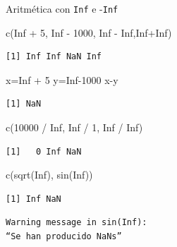 \documentclass[
  ignorenonframetext,
  aspectratio=169,
  spanish,
]{beamer}
\newenvironment{Shaded}{\begin{snugshade}}{\end{snugshade}}
\newcommand{\ConstantTok}[1]{\textcolor[rgb]{0.56,0.35,0.01}{#1}}
\newcommand{\DecValTok}[1]{\textcolor[rgb]{0.68,0.00,0.00}{#1}}
\newcommand{\FunctionTok}[1]{\textcolor[rgb]{0.28,0.35,0.67}{#1}}
\newcommand{\NormalTok}[1]{\textcolor[rgb]{0.00,0.23,0.31}{#1}}
\newcommand{\OtherTok}[1]{\textcolor[rgb]{0.00,0.23,0.31}{#1}}
\newcommand{\SpecialCharTok}[1]{\textcolor[rgb]{0.37,0.37,0.37}{#1}}
\begin{document}
\begin{frame}[fragile]{Aritmética con \texttt{Inf} e -\texttt{Inf}}
\label{aritmuxe9tica-con-inf-e--inf}
\begin{Shaded}
\begin{Highlighting}[]
\FunctionTok{c}\NormalTok{(}\ConstantTok{Inf} \SpecialCharTok{+} \DecValTok{5}\NormalTok{, }\ConstantTok{Inf} \SpecialCharTok{{-}} \DecValTok{1000}\NormalTok{, }\ConstantTok{Inf} \SpecialCharTok{{-}} \ConstantTok{Inf}\NormalTok{,}\ConstantTok{Inf}\SpecialCharTok{+}\ConstantTok{Inf}\NormalTok{)  }
\end{Highlighting}
\end{Shaded}

\begin{verbatim}
[1] Inf Inf NaN Inf
\end{verbatim}
\end{frame}

\begin{frame}[fragile]{}
\label{section-5}
\begin{Shaded}
\begin{Highlighting}[]
\NormalTok{x}\OtherTok{=}\ConstantTok{Inf} \SpecialCharTok{+} \DecValTok{5} 
\NormalTok{y}\OtherTok{=}\ConstantTok{Inf}\DecValTok{{-}1000}
\NormalTok{x}\SpecialCharTok{{-}}\NormalTok{y}
\end{Highlighting}
\end{Shaded}

\begin{verbatim}
[1] NaN
\end{verbatim}

\begin{Shaded}
\begin{Highlighting}[]
\FunctionTok{c}\NormalTok{(}\DecValTok{10000} \SpecialCharTok{/} \ConstantTok{Inf}\NormalTok{, }\ConstantTok{Inf} \SpecialCharTok{/} \DecValTok{1}\NormalTok{, }\ConstantTok{Inf} \SpecialCharTok{/} \ConstantTok{Inf}\NormalTok{) }
\end{Highlighting}
\end{Shaded}

\begin{verbatim}
[1]   0 Inf NaN
\end{verbatim}

\begin{Shaded}
\begin{Highlighting}[]
\FunctionTok{c}\NormalTok{(}\FunctionTok{sqrt}\NormalTok{(}\ConstantTok{Inf}\NormalTok{), }\FunctionTok{sin}\NormalTok{(}\ConstantTok{Inf}\NormalTok{)) }
\end{Highlighting}
\end{Shaded}

\begin{verbatim}
[1] Inf NaN
\end{verbatim}

\begin{verbatim}
Warning message in sin(Inf):
“Se han producido NaNs”
\end{verbatim}
\end{frame}
\end{document}
